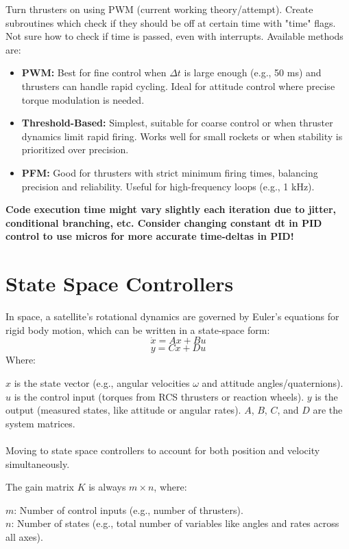 \documentclass[11pt]{scrartcl}
\begin{document}
Turn thrusters on using PWM (current working theory/attempt). Create subroutines which check if they should be off at certain time with "time" flags. Not sure how to check if time is passed, even with interrupts. Available methods are:

\begin{itemize}
	\item \textbf{PWM:} Best for fine control when \(\Delta t\) is large enough (e.g., 50 ms) and thrusters can handle rapid cycling. Ideal for attitude control where precise torque modulation is needed.
	\item \textbf{Threshold-Based:} Simplest, suitable for coarse control or when thruster dynamics limit rapid firing. Works well for small rockets or when stability is prioritized over precision.
	\item \textbf{PFM:} Good for thrusters with strict minimum firing times, balancing precision and reliability. Useful for high-frequency loops (e.g., 1 kHz).
\end{itemize}

\textbf{Code execution time might vary slightly each iteration due to jitter, conditional branching, etc. Consider changing constant dt in PID control to use micros for more accurate time-deltas in PID!}



\section{State Space Controllers}

In space, a satellite’s rotational dynamics are governed by Euler’s equations for rigid body motion, which can be written in a state-space form:
$$\dot{x} = Ax + Bu$$
$$y = Cx + Du$$
Where:

$  x  $ is the state vector (e.g., angular velocities $  \omega  $ and attitude angles/quaternions).
$  u  $ is the control input (torques from RCS thrusters or reaction wheels).
$  y  $ is the output (measured states, like attitude or angular rates).
$  A  $, $  B  $, $  C  $, and $  D  $ are the system matrices. \\ \\


Moving to state space controllers to account for both position and velocity simultaneously.

The gain matrix $ K $ is always $ m \times n $, where:

$ m $: Number of control inputs (e.g., number of thrusters). \\
$ n $: Number of states (e.g., total number of variables like angles and rates across all axes).
\end{document}
